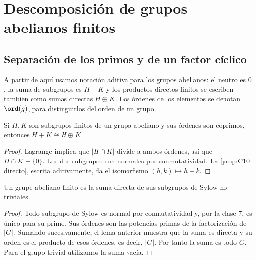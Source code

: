 \section{Descomposición de grupos abelianos finitos}
\subsection{Separación de los primos y de un factor cíclico}
A partir de aquí usamos notación aditiva para los grupos abelianos: el neutro es $0$, la suma de subgrupos es $H+K$ y los productos directos finitos se escriben también como sumas directas $H\oplus K$. Los órdenes de los elementos se denotan $\ord(g)$, para distinguirlos del orden de un grupo.

\begin{lema}\label{lema:C10-coprimos}
Si $H,K$ son subgrupos finitos de un grupo abeliano y sus órdenes son coprimos, entonces $H+K\cong H\oplus K$.
\end{lema}
\begin{proof}
Lagrange implica que $|H\cap K|$ divide a ambos órdenes, así que $H\cap K=\{0\}$. Los dos subgrupos son normales por conmutatividad. La \cref{prop:C10-directo}, escrita aditivamente, da el isomorfismo $(h,k)\mapsto h+k$.
\end{proof}

\begin{coro}\label{coro:C10-primarios}
Un grupo abeliano finito es la suma directa de sus subgrupos de Sylow no triviales.
\end{coro}
\begin{proof}
Todo subgrupo de Sylow es normal por conmutatividad y, por la clase 7, es único para su primo. Sus órdenes son las potencias primas de la factorización de $|G|$. Sumando sucesivamente, el lema anterior muestra que la suma es directa y su orden es el producto de esos órdenes, es decir, $|G|$. Por tanto la suma es todo $G$. Para el grupo trivial utilizamos la suma vacía.
\end{proof}

